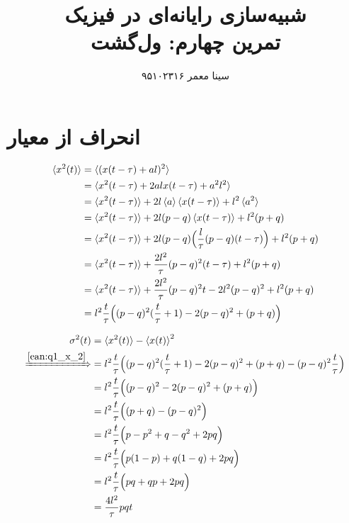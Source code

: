 \documentclass[11pt, a4paper]{article}
\title{\textbf{شبیه‌سازی رایانه‌ای در فیزیک}\\تمرین چهارم: ول‌گشت}
\author{سینا معمر ۹۵۱۰۲۳۱۶}
\begin{document}
\maketitle
\thispagestyle{empty}


\section{\textbf{انحراف از معیار}}

\begin{align}
  \braket{x^2(t)} & = \braket{(x(t - \tau) + al)^2} \nonumber \\
           & = \braket{x^2(t - \tau) + 2alx(t - \tau) + a^2 l^2} \nonumber \\
           & = \braket{x^2(t - \tau)} + 2l\braket{a}\braket{x(t - \tau)} + l^2 \braket{a^2} \nonumber \\
           & = \braket{x^2(t - \tau)} + 2l(p - q)\braket{x(t - \tau)} + l^2 (p + q) \nonumber \\
           & = \braket{x^2(t - \tau)} + 2l(p - q) \Big(\frac{l}{\tau}(p - q)(t - \tau)\Big) + l^2 (p + q) \nonumber \\
           & = \braket{x^2(t - \tau)} + \frac{2l^2}{\tau}(p - q)^2 (t - \tau) + l^2 (p + q) \nonumber \\
           & = \braket{x^2(t - \tau)} + \frac{2l^2}{\tau} (p - q)^2 t - 2l^2 (p - q)^2 + l^2 (p + q) \nonumber \\
           & = l^2 \frac{t}{\tau} \Big((p - q)^2 (\frac{t}{\tau} + 1) - 2(p - q)^2 + (p + q)\Big)
  \label{ean:q1_x_2}
\end{align}

\begin{align}
  \sigma^2(t) & = \braket{x^2(t)} - \braket{x(t)}^2 \nonumber \\
  \xRightarrow{\eqref{ean:q1_x_2}}
           & = l^2 \frac{t}{\tau} \Big((p - q)^2 (\frac{t}{\tau} + 1) - 2(p - q)^2 + (p + q) - (p - q)^2 \frac{t}{\tau} \Big) \nonumber \\
           & = l^2 \frac{t}{\tau} \Big((p - q)^2 - 2(p - q)^2 + (p + q)\Big) \nonumber \\
           & = l^2 \frac{t}{\tau} \Big((p + q) - (p - q)^2\Big) \nonumber \\
           & = l^2 \frac{t}{\tau} \Big(p - p^2 + q - q^2 + 2pq\Big) \nonumber \\
           & = l^2 \frac{t}{\tau} \Big(p(1 - p) + q(1 - q) + 2pq\Big) \nonumber \\
           & = l^2 \frac{t}{\tau} \Big(pq + qp + 2pq\Big) \nonumber \\
           & = \frac{4l^2}{\tau} pqt
\end{align}
\end{document}
